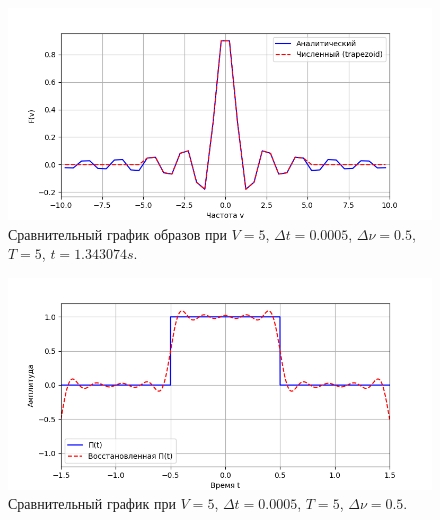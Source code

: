 \documentclass[a4paper]{article}
\begin{document}
\begin{figure}[H]
  \centering
  \includegraphics[width=\textwidth]{src/task_1_1/freq_5_0.0005_5_0.5.png}
  \caption{Сравнительный график образов при $V=5$, $\Delta t=0.0005$, $\Delta \nu=0.5$, $T=5$, $t=1.343074 s$.} 
\end{figure}
\begin{figure}[H]
  \centering
  \includegraphics[width=\textwidth]{src/task_1_1/time_5_0.0005_5_0.5.png}
  \caption{Сравнительный график при $V=5$, $\Delta t=0.0005$, $T=5$, $\Delta \nu=0.5$.}
\end{figure}
\end{document}
